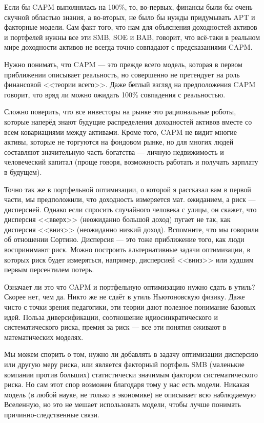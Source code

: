 Если бы CAPM выполнялась на 100\%, то, во-первых, финансы были бы очень скучной
областью знания, а во-вторых, не было бы нужды придумывать APT и факторные 
модели. Сам факт того, что нам для объяснения доходностей активов и портфелей
нужны все эти SMB, SOE и BAB, говорит, что всё-таки в реальном мире доходности
активов не всегда точно совпадают с предсказаниями CAPM.

Нужно понимать, что CAPM --- это прежде всего модель, которая в первом 
приближении описывает реальность, но совершенно не претендует на роль 
финансовой <<теории всего>>. Даже беглый взгляд на предположения CAPM говорит, 
что вряд ли можно ожидать 100\% совпадения с реальностью.

Сложно поверить, что все инвесторы на рынке это рациональные роботы, которые 
наперёд знают будущие распределения доходностей активов вместе со всем 
ковариациями между активами. Кроме того, CAPM не видит многие активы, которые
не торгуются на фондовом рынке, но для многих людей составляют значительную 
часть богатства --- личную недвижимость и человеческий капитал (проще говоря, 
возможность работать и получать зарплату в будущем).

Точно так же в портфельной оптимизации, о которой я рассказал вам в первой 
части, мы предположили, что доходность измеряется мат. ожиданием, а риск --- 
дисперсией. Однако если спросить случайного человека с улицы, он скажет, что 
дисперсия <<вверх>> (неожиданно большой доход) пугает не так, как дисперсия 
<<вниз>> (неожиданно низкий доход). Вспомните, что мы говорили об отношении 
Сортино. Дисперсия --- это тоже приближение того, как люди воспринимают риск. 
Можно построить альтернативные задачи оптимизации, в которых риск будет 
измеряться, например, дисперсией <<вниз>> или худшим первым персентилем потерь.

Означает ли это что CAPM и портфельную оптимизацию нужно сдать в утиль? Скорее 
нет, чем да. Никто же не сдаёт в утиль Ньютоновскую физику. Даже чисто с точки
зрения педагогики, эти теории дают полезное понимание базовых идей. Польза 
диверсификации, соотношение идиосинкратического и систематического риска, 
премия за риск --- все эти понятия оживают в математических моделях.

Мы можем спорить о том, нужно ли добавлять в задачу оптимизации дисперсию или 
другую меру риска, или является факторный портфель SMB (маленькие компании 
против больших) статистически значимым фактором систематического риска. Но сам 
этот спор возможен благодаря тому у нас есть модели. Никакая модель (в любой 
науке, не только в экономике) не описывает всю наблюдаемую Вселенную, но это не
мешает использовать модели, чтобы лучше понимать причинно-следственные связи.

